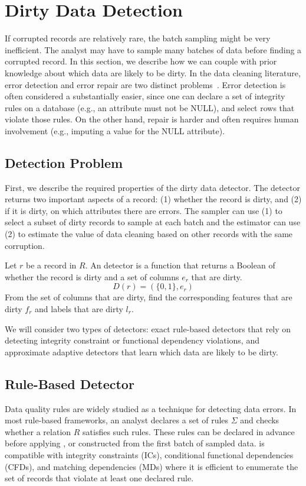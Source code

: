 \section{Dirty Data Detection}\label{det}
If corrupted records are relatively rare, the batch sampling might be very inefficient.
The analyst may have to sample many batches of data before finding a corrupted record.
In this section, we describe how we can couple \sys with prior knowledge about which data are likely to be dirty.
In the data cleaning literature, error detection and error repair are two distinct problems~\cite{DBLP:series/synthesis/2012Fan, Dasu:2003:EDM:861869, rahm2000data}.
Error detection is often considered a substantially easier, since one can declare a set of integrity rules on a database (e.g., an attribute must not be NULL), and select rows that violate those rules.
On the other hand, repair is harder and often requires human involvement (e.g., imputing a value for the NULL attribute).

\subsection{Detection Problem}
First, we describe the required properties of the dirty data detector.
The detector returns two important aspects of a record: 
(1) whether the record is dirty, and (2) if it is dirty, on which attributes there are errors.
The sampler can use (1) to select a subset of dirty records to sample at each batch and 
the estimator can use (2) to estimate the value of data cleaning based on other records with the same corruption.

\begin{definition}[Detector]
Let $r$ be a record in $R$. An detector is a function that returns a Boolean of whether the record is dirty and a set of columns $e_r$ that are dirty.
\[
D(r) = (\{0,1\}, e_r)
\]
From the set of columns that are dirty, find the corresponding features that are dirty $f_r$ and labels that are dirty $l_r$.
\end{definition}

We will consider two types of detectors: exact rule-based detectors that rely on detecting integrity constraint or functional dependency violations, and approximate adaptive detectors that learn which data are likely to be dirty.

\subsection{Rule-Based Detector}\label{rule-det}
Data quality rules are widely studied as a technique for detecting data errors.
In most rule-based frameworks, an analyst declares a set of rules $\Sigma$ and checks whether a relation $R$ satisfies such rules.
These rules can be declared in advance before applying \sys, or constructed from the first batch of sampled data.
\sys is compatible with integrity constraints (ICs), conditional functional dependencies (CFDs), and matching dependencies (MDs) where it is efficient to enumerate the set of records that violate at least one declared rule.

